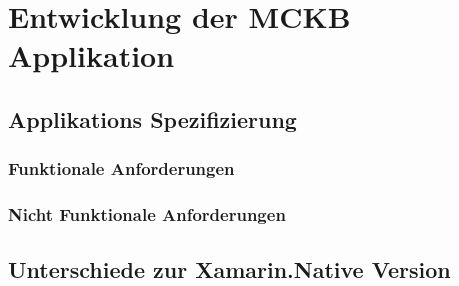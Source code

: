 %
%
% 
% 


\chapter{Entwicklung der MCKB Applikation}
\label{chap:xamarinformsdevelopment}

\section{Applikations Spezifizierung}
\label{sec:mckspecs}

\subsection{Funktionale Anforderungen}
\label{sec:mckbfunkcspecs}

\subsection{Nicht Funktionale Anforderungen}
\label{sec:mckbnonfuncspecs}

\section{Unterschiede zur Xamarin.Native Version}
\label{sec:mckbspecs}